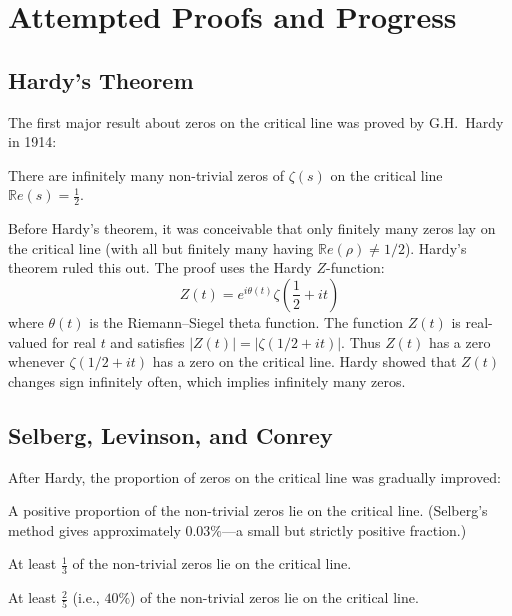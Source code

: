 \section{Attempted Proofs and Progress}
\label{sec:progress}

\subsection{Hardy's Theorem}

The first major result about zeros on the critical line was proved by G.H.\ Hardy in 1914:

\begin{theorem}[Hardy, 1914]
\label{thm:hardy}
There are infinitely many non-trivial zeros of $\zeta(s)$ on the critical line $\mathbb{R}e(s) = \frac{1}{2}$.
\end{theorem}

Before Hardy's theorem, it was conceivable that only finitely many zeros lay on the critical line (with all but finitely many having $\mathbb{R}e(\rho) \neq 1/2$). Hardy's theorem ruled this out. The proof uses the Hardy $Z$-function:
\[
Z(t) = e^{i\theta(t)} \zeta\left(\frac{1}{2} + it\right)
\]
where $\theta(t)$ is the Riemann--Siegel theta function. The function $Z(t)$ is real-valued for real $t$ and satisfies $|Z(t)| = |\zeta(1/2 + it)|$. Thus $Z(t)$ has a zero whenever $\zeta(1/2 + it)$ has a zero on the critical line. Hardy showed that $Z(t)$ changes sign infinitely often, which implies infinitely many zeros.

\subsection{Selberg, Levinson, and Conrey}

After Hardy, the proportion of zeros on the critical line was gradually improved:

\begin{theorem}[Selberg, 1942]
\label{thm:selberg}
A positive proportion of the non-trivial zeros lie on the critical line. (Selberg's method gives approximately $0.03\%$---a small but strictly positive fraction.)
\end{theorem}

\begin{theorem}[Levinson, 1974]
\label{thm:levinson}
At least $\frac{1}{3}$ of the non-trivial zeros lie on the critical line.
\end{theorem}

\begin{theorem}[Conrey, 1989]
\label{thm:conrey}
At least $\frac{2}{5}$ (i.e., $40\%$) of the non-trivial zeros lie on the critical line.
\end{theorem}

